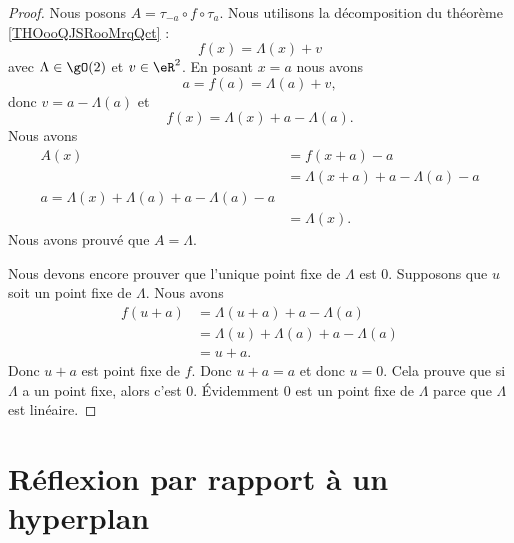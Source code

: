 \begin{proof}
	Nous posons \( A=\tau_{-a}\circ f\circ \tau_a\). Nous utilisons la décomposition du théorème \ref{THOooQJSRooMrqQct} :
	\begin{equation}
		f(x)=\Lambda(x)+v
	\end{equation}
	avec \( \Lambda\in \gO(2)\) et \( v\in \eR^2\). En posant \( x=a\) nous avons
	\begin{equation}
		a=f(a)=\Lambda(a)+v,
	\end{equation}
	donc \( v=a-\Lambda(a)\) et
	\begin{equation}
		f(x)=\Lambda(x)+a-\Lambda(a).
	\end{equation}
	Nous avons
	\begin{subequations}
		\begin{align}
			A(x) & =f(x+a)-a                       \\
			     & =\Lambda(x+a)+a-\Lambda(a)-a    \\
			a=\Lambda(x)+\Lambda(a)+a-\Lambda(a)-a \\
			     & =\Lambda(x).
		\end{align}
	\end{subequations}
	Nous avons prouvé que \( A=\Lambda\).

	Nous devons encore prouver que l'unique point fixe de \( \Lambda\) est \( 0\). Supposons que \( u\) soit un point fixe de \( \Lambda\). Nous avons
	\begin{subequations}
		\begin{align}
			f(u+a) & =\Lambda(u+a)+a-\Lambda(a)          \\
			       & =\Lambda(u)+\Lambda(a)+a-\Lambda(a) \\
			       & =u+a.
		\end{align}
	\end{subequations}
	Donc \( u+a\) est point fixe de \( f\). Donc \( u+a=a\) et donc \( u=0\). Cela prouve que si \( \Lambda\) a un point fixe, alors c'est \( 0\). Évidemment \( 0\) est un point fixe de \( \Lambda\) parce que \( \Lambda\) est linéaire.
\end{proof}


\section{Réflexion par rapport à un hyperplan}


